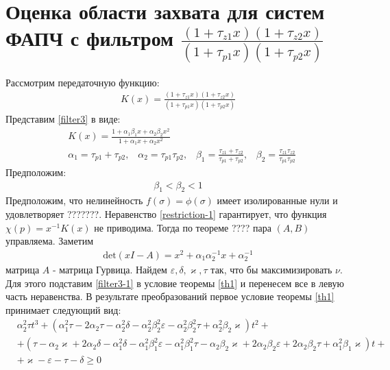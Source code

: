 \documentclass[a4paper,14pt]{extarticle} %
\begin{document}
\newpage
\section{Оценка области захвата для систем ФАПЧ с фильтром $\frac{(1+\tau_{z1}x)(1+\tau_{z2}x)}{(1+\tau_{p1}x)(1+\tau_{p2}x)}$}
 Рассмотрим передаточную функцию:
 \begin{equation}\label{filter3}
 \begin{aligned}
K(x) = \frac{(1+\tau_{z1}x)(1+\tau_{z2}x)}{(1+\tau_{p1}x)(1+\tau_{p2}x)}
 \end{aligned}
\end{equation}
Представим \eqref{filter3} в виде:
 \begin{equation}\label{filter3-1}
 \begin{aligned}
&K(x) = \frac{1+\alpha_1\beta_1x + \alpha_2\beta_2x^2}{1+\alpha_1x + \alpha_2x^2}\\
&\alpha_1 = \tau_{p1} + \tau_{p2}\text{,}\quad 
\alpha_2 = \tau_{p1}\tau_{p2}\text{,}\quad 
\beta_1 = \frac{\tau_{z1}+\tau_{z2}}{\tau_{p1}+\tau_{p2}}\text{,}\quad 
\beta_2 = \frac{\tau_{z1}\tau_{z2}}{\tau_{p1}\tau_{p2}}
 \end{aligned}
\end{equation}
Предположим:
 \begin{equation}\label{restriction-1}
 \begin{aligned}
\beta_1 < \beta_2 < 1
 \end{aligned}
\end{equation}
Предположим, что нелинейность $f(\sigma)=\phi(\sigma)$ имеет изолированные нули и удовлетворяет ???????.
Неравенство \eqref{restriction-1} гарантирует, что функция $\chi(p) = x^{-1}K(x)$ не приводима. Тогда по теореме ???? пара $(A,B)$ управляема. Заметим
 \begin{equation}
 \begin{aligned}
\text{det}(xI-A) = x^2 + \alpha_1\alpha_2^{-1}x + \alpha_2^{-1}
 \end{aligned}
\end{equation}
матрица $A$ - матрица Гурвица. Найдем $\varepsilon, \delta, \varkappa, \tau$ так, что бы максимизировать $\nu$. Для этого подставим \eqref{filter3-1} в условие теоремы \ref{th1} и перенесем все в левую часть неравенства. В результате преобразований первое условие теоремы \ref{th1} принимает следующий вид:
 \begin{equation}
 \begin{aligned}
&\alpha_2^2\tau t^3 + (\alpha_1^2\tau - 2\alpha_2\tau - \alpha_2^2\delta - \alpha_2^2\beta_2^2\varepsilon - \alpha_2^2\beta_2^2\tau + \alpha_2^2\beta_2\varkappa)t^2 +\\
&+ (\tau - \alpha_2\varkappa + 2\alpha_2\delta - \alpha_1^2\delta - \alpha_1^2\beta_1^2\varepsilon - \alpha_1^2\beta_1^2\tau - \alpha_2\beta_2\varkappa + 2\alpha_2\beta_2\varepsilon + 2\alpha_2\beta_2\tau + \alpha_1^2\beta_1\varkappa)t + \\
&+ \varkappa - \varepsilon - \tau - \delta \geq 0
 \end{aligned}
\end{equation}
\end{document}
